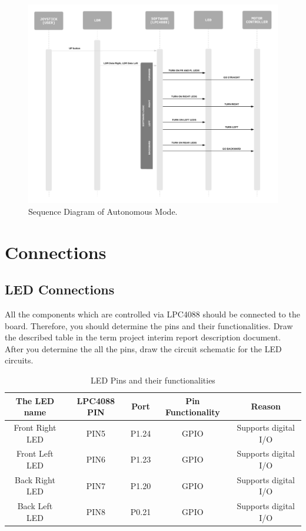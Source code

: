 \documentclass[12pt]{article}
\begin{document}
\begin{figure}[htbp]
\begin{center}
\includegraphics[width=1\columnwidth]{figures/sequence-diagram2.png}
\end{center}
\caption{Sequence Diagram of Autonomous Mode.}
\label{fig:sample}

\end{figure}


\newpage



\section{Connections} %

\subsection{LED Connections}
All the components which are controlled via LPC4088 should be connected to the board. Therefore, you should determine the pins and their functionalities. Draw the described table in the term project interim report description document. After you determine the all the pins, draw the circuit schematic for the LED circuits. \\

\begin{center}
\begin {table}[H]
\begin{tabular}{|c|c|c|c|c|}
\hline
The LED name & LPC4088 PIN & Port & Pin Functionality & Reason \\\hline
Front Right LED & PIN5 & P1.24 & GPIO & Supports digital I/O \\\hline
Front Left LED & PIN6 & P1.23 & GPIO & Supports digital I/O \\\hline
Back Right LED & PIN7 & P1.20 & GPIO & Supports digital I/O \\\hline
Back Left LED & PIN8 & P0.21 & GPIO & Supports digital I/O \\\hline
\end{tabular}
\caption{LED Pins and their functionalities}
\end{table}
\end{center}
\end{document}
